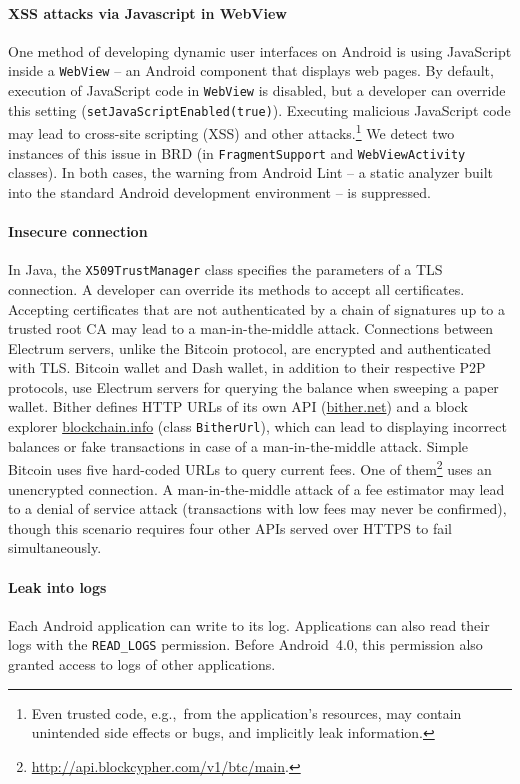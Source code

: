 \paragraph{XSS attacks via Javascript in WebView}
One method of developing dynamic user interfaces on Android is using JavaScript inside a \texttt{WebView} -- an Android component that displays web pages.
By default, execution of JavaScript code in \texttt{WebView} is disabled, but a developer can override this setting (\texttt{setJavaScriptEnabled(true)}).
Executing malicious JavaScript code may lead to cross-site scripting (XSS) and other attacks.\footnote{Even trusted code, e.g.,~from the application's resources, may contain unintended side effects or bugs, and implicitly leak information.}
We detect two instances of this issue in BRD (in \texttt{FragmentSupport} and \texttt{WebViewActivity} classes).
In both cases, the warning from Android Lint -- a static analyzer built into the standard Android development environment -- is suppressed.

\paragraph{Insecure connection}
In Java, the \texttt{X509TrustManager} class specifies the parameters of a TLS connection.
A developer can override its methods to accept all certificates.
Accepting certificates that are not authenticated by a chain of signatures up to a trusted root CA may lead to a man-in-the-middle attack.
Connections between Electrum servers, unlike the Bitcoin protocol, are encrypted and authenticated with TLS\@.
Bitcoin wallet and Dash wallet, in addition to their respective P2P protocols, use Electrum servers for querying the balance when sweeping a paper wallet.
Bither defines HTTP URLs of its own API (\url{bither.net}) and a block explorer \url{blockchain.info} (class \texttt{BitherUrl}), which can lead to displaying incorrect balances or fake transactions in case of a man-in-the-middle attack.
Simple Bitcoin uses five hard-coded URLs to query current fees.
One of them\footnote{\url{http://api.blockcypher.com/v1/btc/main}.} uses an unencrypted connection.
A man-in-the-middle attack of a fee estimator may lead to a denial of service attack (transactions with low fees may never be confirmed), though this scenario requires four other APIs served over HTTPS to fail simultaneously.

\paragraph{Leak into logs}
Each Android application can write to its log.
Applications can also read their logs with the \texttt{READ\_LOGS} permission.
Before Android~4.0, this permission also granted access to logs of other applications.

